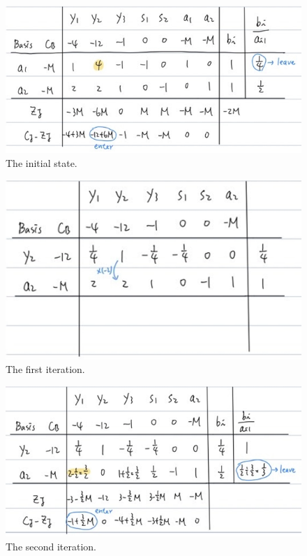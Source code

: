 \documentclass[a4paper,10pt]{article}
\begin{document}
\begin{enumerate}
\begin{enumerate}
{\begin{enumerate}
                \begin{figure}[H]
                    \centering
                    \includegraphics[scale=0.5]{./iter1.png}
                    \caption{The initial state.}
                \end{figure}

                \begin{figure}[H]
                    \centering
                    \includegraphics[scale=0.5]{./iter2.png}
                    \caption{The first iteration.}
                \end{figure}

                \begin{figure}[H]
                    \centering
                    \includegraphics[scale=0.5]{./iter3.png}
                    \caption{The second iteration.}
                \end{figure}


\end{enumerate}}
\end{enumerate}
\end{enumerate}
\end{document}

